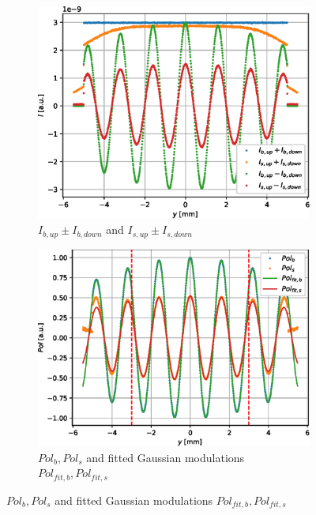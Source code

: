 \begin{figure}[htbp]
	\centering
	\begin{subfigure}[b]{0.45\textwidth}
		\centering
		\includegraphics[width=\textwidth]{simulation-raw-intensity-differential}
		\caption{$I_{b,up} \pm I_{b,down}$ and $I_{s,up} \pm I_{s,down}$}
		\label{fig:simulation-raw-intensity-differential}
	\end{subfigure}
	\hfill
	\begin{subfigure}[b]{0.45\textwidth}
		\centering
		\includegraphics[width=\textwidth]{simulation-raw-intensity-pol}
		\caption{$Pol_b, Pol_s$ and fitted Gaussian modulations $Pol_{fit,b}, Pol_{fit,s}$}
		\label{fig:simulation-raw-intensity-pol}
	\end{subfigure}

\end{figure}
